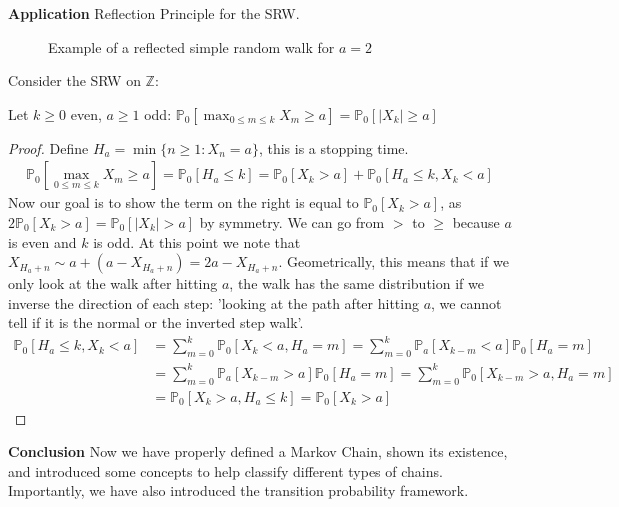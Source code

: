 \noindent
\textbf{Application} Reflection Principle for the SRW.
\begin{figure}
\begin{center}
\end{center}
\caption{Example of a reflected simple random walk for $a=2$}
\end{figure}

Consider the SRW on $\mathbb{Z}$: 

\begin{prop}[]
Let $k\geq 0$ even, $a\geq1$ odd: $\mathbb{P}_{0} \left[ \max_{0 \leq m \leq k} X_m \geq a \right] = \mathbb{P}_{0} \left[ |X_k|\geq a \right]  $
\end{prop}
\begin{proof}
	Define $H_a= \min\{n \geq 1: X_n =a\}$, this is a stopping time.
	\begin{align}
		\mathbb{P}_{0} \left[ \max_{0 \leq m \leq k}X_m \geq a \right] = \mathbb{P}_{0} \left[ H_a \leq k \right] = \mathbb{P}_{0} \left[ X_k > a \right]  + \mathbb{P}_{0} \left[ H_a \leq k, X_k < a \right] 
		\end{align}
		Now our goal is to show the term on the right is equal to $\mathbb{P}_{0} \left[ X_k > a \right] $, as $2\mathbb{P}_{0} \left[ X_k > a \right] = \mathbb{P}_{0} \left[ |X_k| >a \right] $ by symmetry. We can go from $>$ to $\geq$ because $a$ is even and $k$ is odd. At this point we note that $X_{H_a +n} \sim a + (a-X_{H_a +n}) = 2a - X_{H_a +n}$. Geometrically, this means that if we only look at the walk after hitting $a$, the walk has the same distribution if we inverse the direction of each step: 'looking at the path after hitting $a$, we cannot tell if it is the normal or the inverted step walk'.
	\begin{align}
		\mathbb{P}_{0} \left[ H_a \leq k, X_k < a \right] &= \sum_{m=0}^{k} \mathbb{P}_{0} \left[ X_k < a, H_a = m \right] = \sum_{m=0}^{k} \mathbb{P}_{a} \left[ X_{k-m} < a \right] \mathbb{P}_{0} \left[ H_a = m \right]  \\
		&= \sum_{m=0}^{k} \mathbb{P}_{a} \left[ X_{k-m}>a \right] \mathbb{P}_{0} \left[ H_a = m \right] = 
			 \sum_{m=0}^{k} \mathbb{P}_{0} \left[ X_{k-m}>a, H_a =m \right] \\
		&= \mathbb{P}_{0} \left[ X_k >a, H_a \leq k \right] = \mathbb{P}_{0} \left[ X_k > a \right]  
	 \end{align}
	
\end{proof}


\noindent
\textbf{Conclusion} Now we have properly defined a Markov Chain, shown its existence, and introduced some concepts to help classify different types of chains. Importantly, we have also introduced the transition probability framework. 


